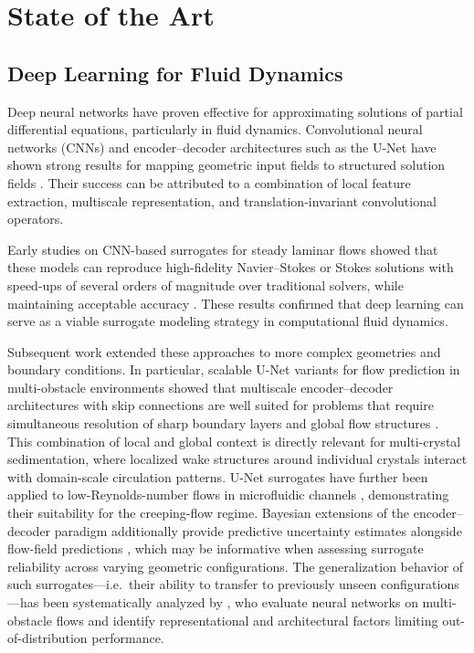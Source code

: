 \chapter{State of the Art}
\label{ch:related}

\section{Deep Learning for Fluid Dynamics}

Deep neural networks have proven effective for approximating solutions of partial differential equations, particularly in fluid dynamics. Convolutional neural networks (CNNs) and encoder–decoder architectures such as the U-Net have shown strong results for mapping geometric input fields to structured solution fields \parencite{ronneberger_u-net_2015,thuerey_deep_2020}. Their success can be attributed to a combination of local feature extraction, multiscale representation, and translation-invariant convolutional operators.

Early studies on CNN-based surrogates for steady laminar flows showed that these models can reproduce high-fidelity Navier--Stokes or Stokes solutions with speed-ups of several orders of magnitude over traditional solvers, while maintaining acceptable accuracy \parencite{guo_convolutional_2016,ribeiro_deepcfd_nodate,chen_u-net_nodate}. These results confirmed that deep learning can serve as a viable surrogate modeling strategy in computational fluid dynamics.

Subsequent work extended these approaches to more complex geometries and boundary conditions. In particular, scalable U-Net variants for flow prediction in multi-obstacle environments showed that multiscale encoder–decoder architectures with skip connections are well suited for problems that require simultaneous resolution of sharp boundary layers and global flow structures \parencite{thuerey_deep_2020,rana_scalable_2024}. This combination of local and global context is directly relevant for multi-crystal sedimentation, where localized wake structures around individual crystals interact with domain-scale circulation patterns. U-Net surrogates have further been applied to low-Reynolds-number flows in microfluidic channels \parencite{le_u-net-based_2022}, demonstrating their suitability for the creeping-flow regime. Bayesian extensions of the encoder--decoder paradigm additionally provide predictive uncertainty estimates alongside flow-field predictions \parencite{zhu_bayesian_2018}, which may be informative when assessing surrogate reliability across varying geometric configurations. The generalization behavior of such surrogates—i.e.\ their ability to transfer to previously unseen configurations—has been systematically analyzed by \textcite{morimoto_generalization_2022}, who evaluate neural networks on multi-obstacle flows and identify representational and architectural factors limiting out-of-distribution performance.

